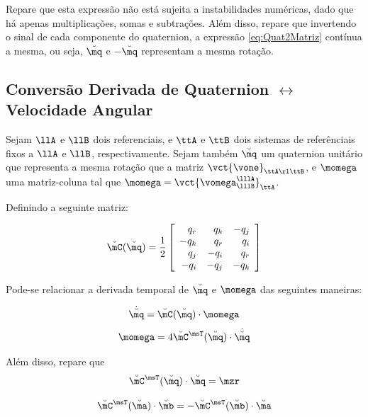 \documentclass[]{politex}
\begin{document}
Repare que esta expressão não está sujeita a instabilidades numéricas, dado que há apenas multiplicações, somas e subtrações. Além disso, repare que invertendo o sinal de cada componente do quaternion, a expressão \eqref{eq:Quat2Matriz} contínua a mesma, ou seja, $\breve{\mq}$ e $-\breve{\mq}$ representam a mesma rotação. 

\subsection{Conversão Derivada de Quaternion $\leftrightarrow$ Velocidade Angular} \label{subsec:DerivadaQuat}

Sejam $\llA$ e $\llB$ dois referenciais, e $\ttA$ e $\ttB$ dois sistemas de referênciais fixos a $\llA$ e $\llB$, respectivamente. Sejam também $\breve{\mq}$ um quaternion unitário que representa a mesma rotação que a matriz $\vct{\vone}_{\ttA \rl \ttB}$, e $\momega$ uma matriz-coluna tal que $\momega = \vct{\vomega_{\lllB}^{\lllA}}_{\ttA}$.

Definindo a seguinte matriz:

\begin{equation}
\breve{\mC}(\breve{\mq}) =
\frac{1}{2}
\begin{bmatrix}
\begin{array}{rrr}
q_r & q_k & -q_j \\
-q_k & q_r & q_i\\
q_j & -q_i & q_r\\
-q_i & -q_j & - q_k
\end{array}
\end{bmatrix}
\end{equation}

Pode-se relacionar a derivada temporal de $\breve{\mq}$ e $\momega$ das seguintes maneiras:

\begin{equation} \label{eq:dQuat2w}
\dot{\breve{\mq}} = \breve{\mC}(\breve{\mq}) \cdot \momega
\end{equation}
\begin{equation}
\momega = 4 \breve{\mC}^\msT (\breve{\mq})\cdot \dot{\breve{\mq}}
\end{equation}

Além disso, repare que 
\begin{equation} \label{eq:CQuatZero}
\breve{\mC}^\msT (\breve{\mq})\cdot \breve{\mq} = \mzr
\end{equation}

\begin{equation}
\breve{\mC}^\msT (\breve{\ma})\cdot \breve{\mb} = -\breve{\mC}^\msT (\breve{\mb})\cdot \breve{\ma}
\end{equation}
\end{document}
